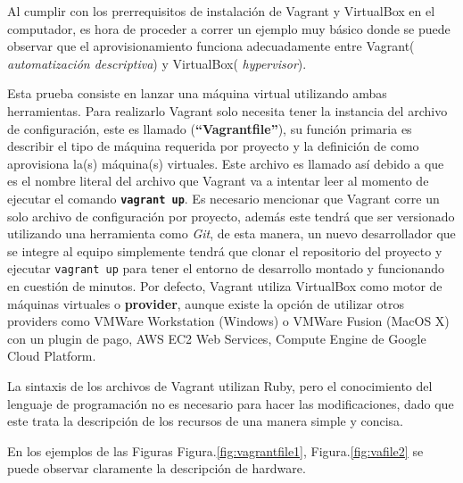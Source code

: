 \documentclass[letterpaper, 12pt, oneside]{article}
\begin{document}
    Al cumplir con los prerrequisitos de instalación de Vagrant y VirtualBox en el computador, es hora de proceder a correr un ejemplo muy básico donde se puede observar que el aprovisionamiento funciona adecuadamente entre Vagrant(\textit{ automatización descriptiva}) y VirtualBox(\textit{ hypervisor}).
    
    Esta prueba consiste en lanzar una máquina virtual utilizando ambas herramientas. Para realizarlo Vagrant solo necesita tener la instancia del archivo de configuración, este es llamado (\textbf{“Vagrantfile”}), su función primaria es describir el tipo de máquina requerida por proyecto y la definición de como aprovisiona la(s) máquina(s) virtuales. Este archivo es llamado así debido a que es el nombre literal del archivo que Vagrant va a intentar leer al momento de ejecutar el comando \textbf{\texttt{vagrant up}}. 
    Es necesario mencionar que Vagrant corre un solo archivo de configuración por proyecto, además este tendrá que ser versionado utilizando una herramienta como  \textit{Git}, de esta manera, un nuevo desarrollador que se integre al equipo simplemente tendrá que clonar el repositorio del proyecto y ejecutar \texttt{vagrant up} para tener el entorno de desarrollo montado y funcionando en cuestión de minutos. Por defecto, Vagrant utiliza VirtualBox como motor de máquinas virtuales o \textbf{provider}, aunque existe la opción de utilizar otros providers como VMWare Workstation (Windows) o VMWare Fusion (MacOS X) con un plugin de pago, AWS EC2 Web Services, Compute Engine de Google Cloud Platform.
    
    La sintaxis de los archivos de Vagrant utilizan Ruby, pero el conocimiento del lenguaje de programación no es necesario para hacer las modificaciones, dado que este trata la descripción de los recursos de una manera simple y concisa. 
    
    En los ejemplos de las Figuras  Figura.\ref{fig:vagrantfile1},  Figura.\ref{fig:vafile2} se puede observar claramente la descripción de hardware.
    
\end{document}
